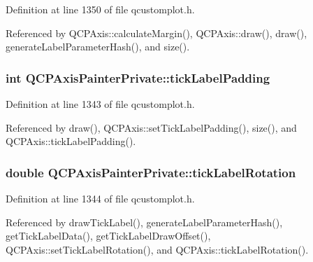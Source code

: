 Definition at line 1350 of file qcustomplot.\+h.



Referenced by Q\+C\+P\+Axis\+::calculate\+Margin(), Q\+C\+P\+Axis\+::draw(), draw(), generate\+Label\+Parameter\+Hash(), and size().

\hypertarget{class_q_c_p_axis_painter_private_a264cfa080e84e536cf2d1ab9c5d5cc5f}{}
\subsubsection[{tick\+Label\+Padding}]{\setlength{\rightskip}{0pt plus 5cm}int Q\+C\+P\+Axis\+Painter\+Private\+::tick\+Label\+Padding}\label{class_q_c_p_axis_painter_private_a264cfa080e84e536cf2d1ab9c5d5cc5f}


Definition at line 1343 of file qcustomplot.\+h.



Referenced by draw(), Q\+C\+P\+Axis\+::set\+Tick\+Label\+Padding(), size(), and Q\+C\+P\+Axis\+::tick\+Label\+Padding().

\hypertarget{class_q_c_p_axis_painter_private_ae6ade9232a8e400924009e8edca94bac}{}
\subsubsection[{tick\+Label\+Rotation}]{\setlength{\rightskip}{0pt plus 5cm}double Q\+C\+P\+Axis\+Painter\+Private\+::tick\+Label\+Rotation}\label{class_q_c_p_axis_painter_private_ae6ade9232a8e400924009e8edca94bac}


Definition at line 1344 of file qcustomplot.\+h.



Referenced by draw\+Tick\+Label(), generate\+Label\+Parameter\+Hash(), get\+Tick\+Label\+Data(), get\+Tick\+Label\+Draw\+Offset(), Q\+C\+P\+Axis\+::set\+Tick\+Label\+Rotation(), and Q\+C\+P\+Axis\+::tick\+Label\+Rotation().

\hypertarget{class_q_c_p_axis_painter_private_ad0a4998ca358ba751e84fca45a025abd}{}
